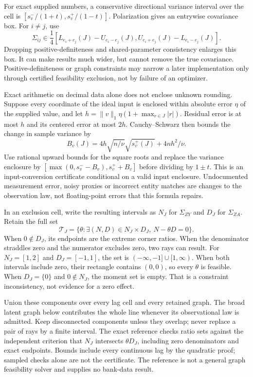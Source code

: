For exact supplied numbers, a conservative directional variance interval
over the cell is \([s^-_v/(1+t),s^+_v/(1-t)]\). Polarization gives an
entrywise covariance box. For \(i\ne j\), use \[
 \Sigma_{ij}\in\frac14
 [L_{e_i+e_j}(J)-U_{e_i-e_j}(J),
  U_{e_i+e_j}(J)-L_{e_i-e_j}(J)].
\] Dropping positive-definiteness and shared-parameter consistency
enlarges this box. It can make results much wider, but cannot remove the
true covariance. Positive-definiteness or graph constraints may narrow a
later implementation only through certified feasibility exclusion, not
by failure of an optimizer.

Exact arithmetic on decimal data alone does not enclose unknown
rounding. Suppose every coordinate of the ideal input is enclosed within
absolute error \(\eta\) of the supplied value, and let
\(h=\|v\|_1\eta(1+\max_{r\in J}|r|)\). Residual error is at most \(h\)
and its centered error at most \(2h\). Cauchy--Schwarz then bounds the
change in sample variance by \[
 B_v(J)=4h\sqrt{n/\nu}\sqrt{s^+_v(J)}+4nh^2/\nu.
\] Use rational upward bounds for the square roots and replace the
variance enclosure by \([\max(0,s^-_v-B_v),s^+_v+B_v]\) before dividing
by \(1\pm t\). This is an input-conversion certificate conditional on a
valid input enclosure. Undocumented measurement error, noisy proxies or
incorrect entity matches are changes to the observation law, not
floating-point errors that this formula repairs.

In an exclusion cell, write the resulting intervals as \(N_J\) for
\(\Sigma_{ZY}\) and \(D_J\) for \(\Sigma_{ZA}\). Retain the full set \[
 \mathcal T_J=\{\theta:\exists (N,D)\in N_J\times D_J,
                      \ N-\theta D=0\}.
\] When \(0\notin D_J\), its endpoints are the extreme corner ratios.
When the denominator straddles zero and the numerator excludes zero, two
rays can result. For \(N_J=[1,2]\) and \(D_J=[-1,1]\), the set is
\(( -\infty,-1]\cup[1,\infty)\). When both intervals include zero, their
rectangle contains \((0,0)\), so every \(\theta\) is feasible. When
\(D_J=\{0\}\) and \(0\notin N_J\), the moment set is empty. That is a
constraint inconsistency, not evidence for a zero effect.

Union these components over every lag cell and every retained graph. The
broad latent graph below contributes the whole line whenever its
observational law is admitted. Keep disconnected components unless they
overlap; never replace a pair of rays by a finite interval. The exact
reference checks ratio sets against the independent criterion that
\(N_J\) intersects \(\theta D_J\), including zero denominators and exact
endpoints. Bounds include every continuous lag by the quadratic proof;
sampled checks alone are not the certificate. The reference is not a
general graph feasibility solver and supplies no bank-data result.

